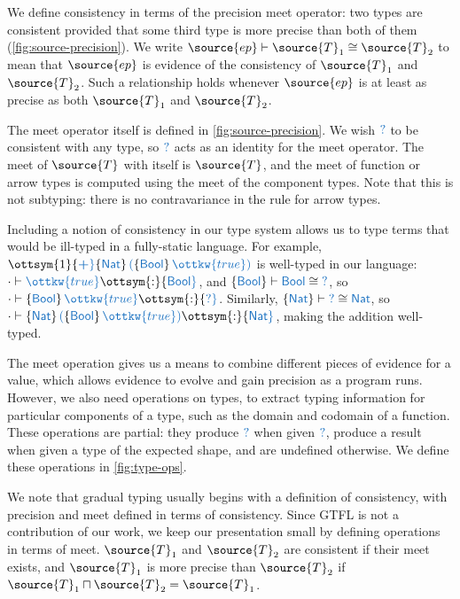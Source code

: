 \documentclass[11pt]{article}
\newcommand{\blue}[1]{ {\color{RoyalBlue}{{#1}}} }
\begin{document}
We define consistency in terms of the precision meet operator: two types
are consistent provided that some third type is more precise than both of them (\autoref{fig:source-precision}).
We write $\source{ep}  \vdash  \source{T}_{{\mathrm{1}}}  \cong  \source{T}_{{\mathrm{2}}}$ to mean that $\source{ep}$ is evidence of the consistency of $\source{T}_{{\mathrm{1}}}$ and $\source{T}_{{\mathrm{2}}}$.
Such a relationship holds whenever $\source{ep}$ is at least as precise as both $\source{T}_{{\mathrm{1}}}$ and $\source{T}_{{\mathrm{2}}}$.

The meet operator itself is defined in \autoref{fig:source-precision}. We wish $ \blue{?} $ to be consistent with any type,
so $ \blue{?} $ acts as an identity for the meet operator. The meet of $\source{T}$ with itself is $\source{T}$, and
the meet of function or arrow types is computed using the meet of the component types.
Note that this is not subtyping: there is no contravariance in the rule for arrow types.

Including a notion of consistency in our type system allows us to type terms that would be ill-typed
in a fully-static language.
For example, $ \ottsym{1}  \blue{\boldsymbol{+} }   \{   \blue{\mathsf{Nat} }   \}  \,  \blue{(}   \{   \blue{\mathsf{Bool} }   \}  \,  \blue{ \ottkw{true} }   \blue{)}  $ is well-typed in our language: $ \cdot   \vdash   \blue{ \ottkw{true} }   \ottsym{:}   \blue{\mathsf{Bool} } $,
and $ \{   \blue{\mathsf{Bool} }   \}   \vdash   \blue{\mathsf{Bool} }   \cong   \blue{?} $, so $ \cdot   \vdash   \{   \blue{\mathsf{Bool} }   \}  \,  \blue{ \ottkw{true} }   \ottsym{:}   \blue{?} $. Similarly, $ \{   \blue{\mathsf{Nat} }   \}   \vdash   \blue{?}   \cong   \blue{\mathsf{Nat} } $,
so $ \cdot   \vdash   \{   \blue{\mathsf{Nat} }   \}  \,  \blue{(}   \{   \blue{\mathsf{Bool} }   \}  \,  \blue{ \ottkw{true} }   \blue{)}   \ottsym{:}   \blue{\mathsf{Nat} } $, making the addition well-typed.

The meet operation gives us a means to combine different pieces of evidence for a value,
which allows evidence to evolve and gain precision as a program runs.
However, we also need operations on types, to extract typing information for particular
components of a type, such as the domain and codomain of a function. These operations are partial: they produce $ \blue{?} $ 
when given $ \blue{?} $, produce a result when given a type of the expected shape, and are undefined otherwise.
We define these operations in \autoref{fig:type-ops}.

We note that gradual typing usually begins with a definition of consistency, with precision and meet defined
in terms of consistency. Since GTFL is not a contribution of our work, we keep our presentation small
by defining operations in terms of meet. $\source{T}_{{\mathrm{1}}}$ and $\source{T}_{{\mathrm{2}}}$ are consistent if their meet exists,
and $\source{T}_{{\mathrm{1}}}$ is more precise than $\source{T}_{{\mathrm{2}}}$ if $ \source{T}_{{\mathrm{1}}}  \sqcap  \source{T}_{{\mathrm{2}}}  =  \source{T}_{{\mathrm{1}}} $.
\end{document}
